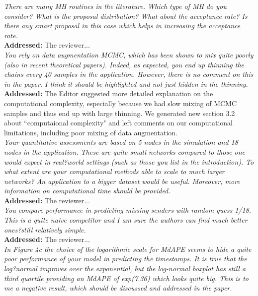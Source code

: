 \documentclass[12pt]{article}
\newcommand{\grey}[1]{{\color{mygrey}#1}}
\theoremstyle{definition}
\begin{document}
 \grey{\emph{There are many MH routines in the literature. Which type of MH do you consider? What is the proposal distribution? What about the acceptance rate? Is there any smart proposal in this case which helps in increasing the acceptance rate.}}\\

\noindent \textcolor{MyGreen}{\textbf{Addressed:}} The reviewer... \\


 \grey{\emph{You rely on data augmentation MCMC, which has been shown to mix quite poorly (also in recent theoretical papers). Indeed, as expected, you end up thinning the chains every 40 samples in the application. However, there is no comment on this in the paper. I think it should be highlighted and not just hidden in the thinning.}}\\

\noindent \textcolor{MyGreen}{\textbf{Addressed:}} The Editor suggested more detailed explanation on the computational complexity, especially because we had slow mixing of MCMC samples and thus end up with large thinning. We generated new section 3.2 about ``computaional complexity" and left comments on our computational limitations, including poor mixing of data augmentation.\\


 \grey{\emph{Your quantitative assessments are based on 5 nodes in the simulation and 18 nodes in the application. These are quite small networks compared to those one would expect in real?world settings (such as those you list in the introduction). To what extent are your computational methods able to scale to much larger networks? An application to a bigger dataset would be useful. Moreover, more information on computational time should be provided.}}\\

\noindent \textcolor{MyGreen}{\textbf{Addressed:}} The reviewer... \\


 \grey{\emph{You compare performance in predicting missing senders with random guess 1/18. This is a quite naive competitor and I am sure the authors can find much better ones?still relatively simple.}}\\

\noindent \textcolor{MyGreen}{\textbf{Addressed:}} The reviewer... \\

 \grey{\emph{In Figure 4c the choice of the logarithmic scale for MdAPE seems to hide a quite poor performance of your model in predicting the timestamps. It is true that the log?normal improves over the exponential, but the log-normal boxplot has still a third quartile providing an MdAPE of exp(7.36) which looks quite big. This is to me a negative result, which should be discussed and addressed in the paper.}}\\
\end{document}
